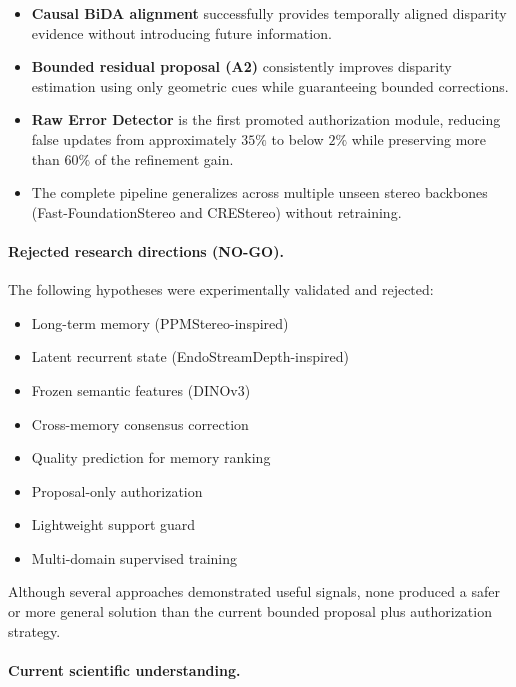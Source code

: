 \documentclass[11pt,a4paper]{article}
\begin{document}
\begin{itemize}
    \item \textbf{Causal BiDA alignment} successfully provides temporally aligned disparity evidence without introducing future information.
    \item \textbf{Bounded residual proposal (A2)} consistently improves disparity estimation using only geometric cues while guaranteeing bounded corrections.
    \item \textbf{Raw Error Detector} is the first promoted authorization module, reducing false updates from approximately $35\%$ to below $2\%$ while preserving more than $60\%$ of the refinement gain.
    \item The complete pipeline generalizes across multiple unseen stereo backbones (Fast-FoundationStereo and CREStereo) without retraining.
\end{itemize}

\paragraph{Rejected research directions (NO-GO).}

The following hypotheses were experimentally validated and rejected:

\begin{itemize}
    \item Long-term memory (PPMStereo-inspired)
    \item Latent recurrent state (EndoStreamDepth-inspired)
    \item Frozen semantic features (DINOv3)
    \item Cross-memory consensus correction
    \item Quality prediction for memory ranking
    \item Proposal-only authorization
    \item Lightweight support guard
    \item Multi-domain supervised training
\end{itemize}

Although several approaches demonstrated useful signals, none produced a safer or more general solution than the current bounded proposal plus authorization strategy.

\paragraph{Current scientific understanding.}
\end{document}
